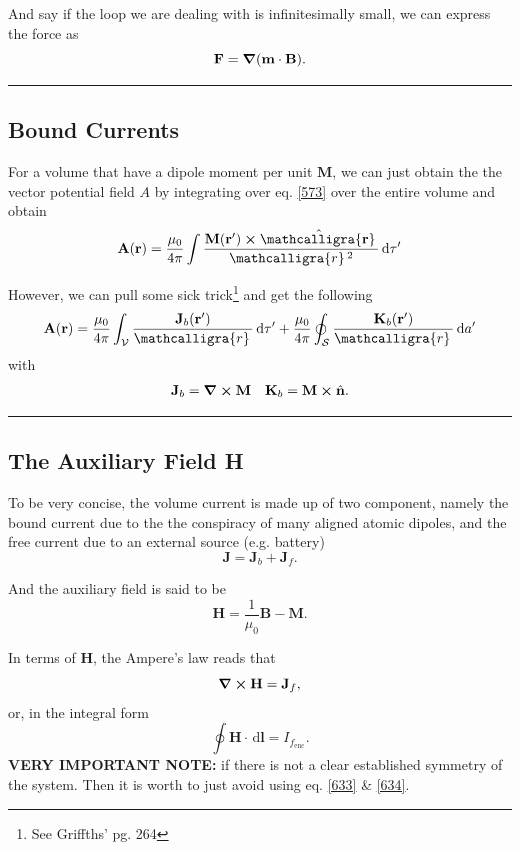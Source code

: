 \documentclass[12pt,english]{article}
\newcommand{\dmr}[1]{\, \mathrm{d}#1} %
\numberwithin{equation}{subsection}
\newcommand{\curly}[1]{\ensuremath{\mathcalligra{#1}\,}}
\let\oldhat\hat
\renewcommand{\vec}[1]{\mathbf{#1}}
\renewcommand{\hat}[1]{\oldhat{\mathbf{#1}}}
\begin{document}
And say if the loop we are dealing with is infinitesimally small, we can express the force as
\begin{equation}
    \vec{F} = \grad(\vec{m}\cdot\vec{B}).
\end{equation}

\par\noindent\rule{\textwidth}{0.4pt}
\subsection{Bound Currents}
For a volume that have a dipole moment per unit $\vec{M}$, we can just obtain the the vector potential field $A$ by integrating over eq. \ref{573} over the entire volume and obtain
\begin{equation}
    \vec{A}(\vec{r}) = \frac{\mu_0}{4\pi}\int\frac{\vec{M}(\vec{r}')\cross \hat{\curly{r}}}{\curly{r}^2}\dmr{\tau'}
\end{equation}

However, we can pull some sick trick\footnote{See Griffths' pg. 264} and get the following
\begin{equation}
    \vec{A}(\vec{r}) = \frac{\mu_0}{4\pi}\int_{\mathcal{V}}\frac{\vec{J}_b(\vec{r}')}{\curly{r}}\dmr{\tau'}+\frac{\mu_0}{4\pi}\oint_{\mathcal{S}}\frac{\vec{K}_b(\vec{r}')}{\curly{r}}\dmr{a'}
\end{equation} 
with 
\begin{align*}
    \vec{J}_b = \curl\vec{M} && \vec{K}_b = \vec{M}\cross\hat{n}.
\end{align*}

\par\noindent\rule{\textwidth}{0.4pt}
\subsection{The Auxiliary Field H}
To be very concise, the volume current is made up of two component, namely the bound current due to the the conspiracy of many aligned atomic dipoles, and the free current due to an external source (e.g. battery)
\begin{equation}
    \vec{J} = \vec{J}_b + \vec{J}_f.
\end{equation}

And the auxiliary field is said to be 
\begin{equation}
    \vec{H} = \frac{1}{\mu_0}\vec{B} - \vec{M}.
\end{equation}

In terms of $\vec{H}$, the Ampere's law reads that
\begin{equation}
    \curl \vec{H} = \vec{J}_f, \label{633}
\end{equation}
or, in the integral form
\begin{equation}
    \oint \vec{H}\cdot\dmr{\vec{l}} = I_{f_{\text{enc}}}. \label{634}
\end{equation}
\textbf{VERY IMPORTANT NOTE:} if there is not a clear established symmetry of the system. Then it is worth to just avoid using eq. \ref{633} \& \ref{634}.
\end{document}
